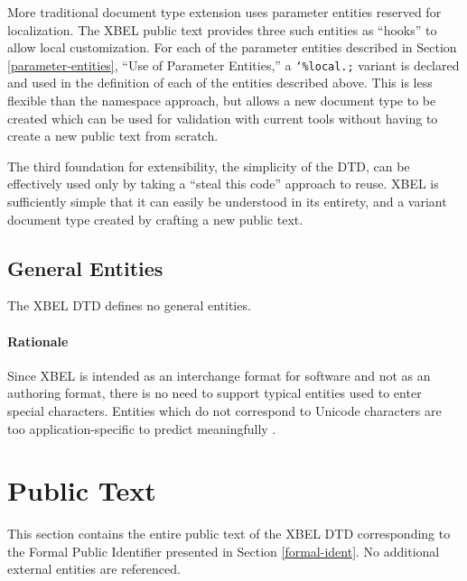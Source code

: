 \documentclass{howto}
\newcommand{\paramentity}[1]{\texttt{\char`\%#1;}}
\newenvironment{longexample}
  {\begingroup\small}
  {\endgroup}
\begin{document}
    More traditional document type extension uses parameter entities
    reserved for localization.  The XBEL public text provides three
    such entities as ``hooks'' to allow local customization.  For each 
    of the parameter entities described in Section
    \ref{parameter-entities}, ``Use of Parameter Entities,'' a
    \paramentity{local.} variant is declared and used in the 
    definition of each of the entities described above.  This is less
    flexible than the namespace approach, but allows a new document
    type to be created which can be used for validation with current
    tools without having to create a new public text from scratch.

    The third foundation for extensibility, the simplicity of the DTD, 
    can be effectively used only by taking a ``steal this code''
    approach to reuse.  XBEL is sufficiently simple that it can easily 
    be understood in its entirety, and a variant document type created 
    by crafting a new public text.

  \subsection{General Entities
              \label{general-entities}}

    The XBEL DTD defines no general entities.

    \paragraph*{Rationale}
      Since XBEL is intended as an interchange format for software and
      not as an authoring format, there is no need to support typical
      entities used to enter special characters.  Entities which do
      not correspond to Unicode characters are too
      application-specific to predict meaningfully
      \cite{unicode20,unicode21}.


\appendix
\section{Public Text
         \label{public-text}}

  This section contains the entire public text of the XBEL DTD
  corresponding to the Formal Public Identifier presented in Section
  \ref{formal-ident}.  No additional external entities are
  referenced.


\begin{longexample}

\end{longexample}


\nocite{*}


\end{document}
